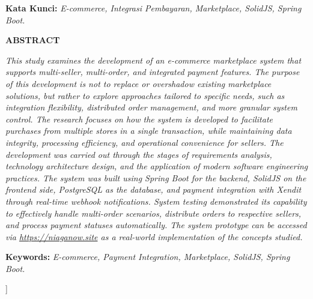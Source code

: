 \documentclass[12pt,a4paper,twocolumn]{article}
\begin{document}
\begin{@twocolumnfalse}
\begin{center}
\begin{minipage}{0.85\textwidth}
\vspace{6pt}
{\footnotesize\textbf{Kata Kunci:} \textit{E-commerce, Integrasi Pembayaran, Marketplace, SolidJS, Spring Boot.}}
\end{minipage}

\vspace{16pt}

\begin{minipage}{0.85\textwidth}
\begin{center}
    {\normalsize\bfseries ABSTRACT}
\end{center}
\vspace{-14pt}
{\footnotesize\itshape\singlespacing
This study examines the development of an e-commerce marketplace system that supports multi-seller, multi-order, and integrated payment features. The purpose of this development is not to replace or overshadow existing marketplace solutions, but rather to explore approaches tailored to specific needs, such as integration flexibility, distributed order management, and more granular system control. The research focuses on how the system is developed to facilitate purchases from multiple stores in a single transaction, while maintaining data integrity, processing efficiency, and operational convenience for sellers. The development was carried out through the stages of requirements analysis, technology architecture design, and the application of modern software engineering practices. The system was built using Spring Boot for the backend, SolidJS on the frontend side, PostgreSQL as the database, and payment integration with Xendit through real-time webhook notifications. System testing demonstrated its capability to effectively handle multi-order scenarios, distribute orders to respective sellers, and process payment statuses automatically. The system prototype can be accessed via \url{https://niaganow.site} as a real-world implementation of the concepts studied.
\par}

\vspace{6pt}
{\footnotesize\textbf{Keywords:} \textit{E-commerce, Payment Integration, Marketplace, SolidJS, Spring Boot.}}
\end{minipage}

\vspace{20pt}

\end{center}
\end{@twocolumnfalse}
]
\end{document}
